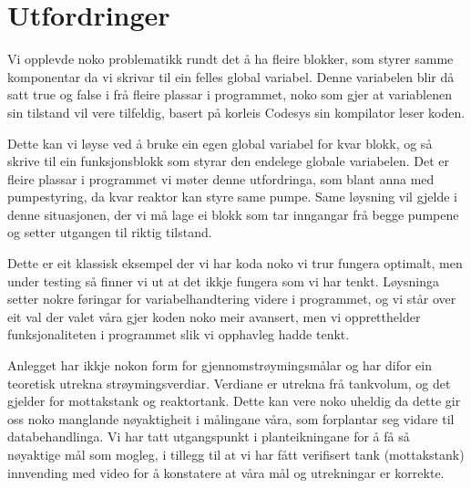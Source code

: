 \section{Utfordringer}
\thispagestyle{fancy}

Vi opplevde noko problematikk rundt det å ha fleire blokker, som styrer samme komponentar da vi skrivar til ein felles global variabel.
Denne variabelen blir då satt true og false i frå fleire plassar i programmet, noko som gjer at variablenen sin tilstand vil vere tilfeldig, basert på korleis Codesys sin kompilator leser koden.

Dette kan vi løyse ved å bruke ein egen global variabel for kvar blokk, og så skrive til ein funksjonsblokk som styrar den endelege globale variabelen.
Det er fleire plassar i programmet vi møter denne utfordringa, som blant anna med pumpestyring, da kvar reaktor kan styre same pumpe.
Same løysning vil gjelde i denne situasjonen, der vi må lage ei blokk som tar inngangar frå begge pumpene og setter utgangen til riktig tilstand.  

Dette er eit klassisk eksempel der vi har koda noko vi trur fungera optimalt, men under testing så finner vi ut at det ikkje fungera som vi har tenkt.
Løysninga setter nokre føringar for variabelhandtering videre i programmet, og vi står over eit val der valet våra gjer koden noko meir avansert, men vi oppretthelder funksjonaliteten i programmet slik vi opphavleg hadde tenkt.


Anlegget har ikkje nokon form for gjennomstrøymingsmålar og har difor ein teoretisk utrekna strøymingsverdiar. 
Verdiane er utrekna frå tankvolum, og det gjelder for mottakstank og reaktortank. 
Dette kan vere noko uheldig da dette gir oss noko manglande nøyaktigheit i målingane våra, som forplantar seg vidare til databehandlinga.
Vi har tatt utgangspunkt i planteikningane for å få så nøyaktige mål som mogleg, i tillegg til at vi har fått verifisert tank (mottakstank) innvending med video for å konstatere at våra mål og utrekningar er korrekte.
